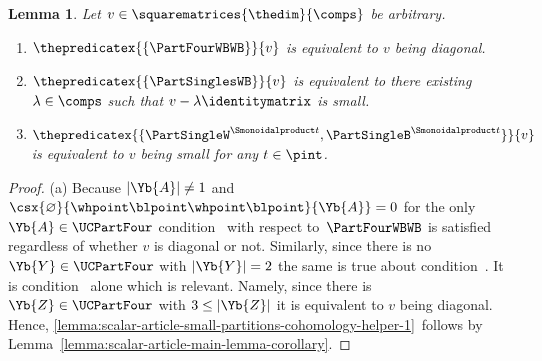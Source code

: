 \documentclass[pdftex]{sigma}
\numberwithin{equation}{section}
\newtheorem{Lemma}[Theorem]{Lemma}
\begin{document}
{
  \newcommand{\somerel}{r}
  \newcommand{\indj}{j}
  \newcommand{\indi}{i}
  \newcommand{\infree}{g}
  \newcommand{\outfree}{j}
  \newcommand{\infreex}[1]{g_{#1}}
  \newcommand{\outfreex}[1]{j_{#1}}
  \newcommand{\thetuple}{x^\themat}
  \newcommand{\thetuplex}[1]{x_{#1}^\themat}
  \newcommand{\thepartitionset}{\mathcal{S}}
    \newcommand{\incol}{\Yc{c}}
    \newcommand{\inlen}{k}
    \newcommand{\outcol}{\Yc{d}}
    \newcommand{\outlen}{\ell}
    \newcommand{\thepartition}{p}
    \newcommand{\themat}{v}
    \newcommand{\thematx}[2]{v_{#1,#2}}
    \newcommand{\thesum}{\lambda}
    \newcommand{\theid}{\identitymatrix}
    \newcommand{\partparamone}{w}
    \newcommand{\partparamtwo}{m}
    \newcommand{\partparamthree}{s}
    \newcommand{\partparamfour}{t}
    \newcommand{\partparamfive}{K}
    \newcommand{\partparamsix}{F}
    \newcommand{\partparamseven}{E}
    \newcommand{\partparameight}{H}
  \begin{Lemma}
    \label{lemma:scalar-article-small-partitions-cohomology-helper}
    Let $\themat\in\squarematrices{\thedim}{\comps}$ be arbitrary.
\begin{enumerate}
\item\label{lemma:scalar-article-small-partitions-cohomology-helper-1}  $\thepredicatex{\{\PartFourWBWB\}}{\themat}$ is equivalent  to  $\themat$ being diagonal.
\item\label{lemma:scalar-article-small-partitions-cohomology-helper-2}  $\thepredicatex{\{\PartSinglesWB\}}{\themat}$ is equivalent to there existing $\thesum\in\comps$ such that  $\themat-\thesum\theid$ is small.
\item\label{lemma:scalar-article-small-partitions-cohomology-helper-3}  $\thepredicatex{\{\PartSingleW^{\Smonoidalproduct \partparamfour},\PartSingleB^{\Smonoidalproduct \partparamfour}\}}{\themat}$ is equivalent  to $\themat$ being small  for any $\partparamfour\in\pint$.
\end{enumerate}
\end{Lemma}
\begin{proof}
  \newcommand{\inds}{s}
  \newcommand{\indd}{d}
  \newcommand{\somecolor}{\Yc{e}}
  \newcommand{\blocklabeling}{h}
  \newcommand{\someblock}{\Yb{B}}
  \newcommand{\anyblock}{\Yb{A}}
  \newcommand{\thetwoblock}{\Yb{Y}}
  \newcommand{\thethreeblock}{\Yb{Z}}
  \newcommand{\specialblock}{\Yb{A}}
(a)
    Because $|\anyblock|\neq 1$ and $\csx{\varnothing}{\whpoint\blpoint\whpoint\blpoint}{\anyblock}=0$ for the only $\anyblock\in\UCPartFour$ con\-di\-tion~\conditionone{} with respect to~$\PartFourWBWB$ is satisfied
    regardless of whether $\themat$ is diagonal or not. Similarly, since there is no  $\thetwoblock\in\UCPartFour$ with $|\thetwoblock|= 2$ the same is true about con\-di\-tion~\conditiontwo{}. It is con\-di\-tion~\conditionthree{} alone which is relevant. Namely, since there is   $\thethreeblock\in\UCPartFour$ with $3\leq |\thethreeblock|$ it is equivalent to $\themat$ being diagonal. Hence, \ref{lemma:scalar-article-small-partitions-cohomology-helper-1}~follows by  Lem\-ma~\ref{lemma:scalar-article-main-lemma-corollary}.


\end{proof}}
\end{document}

